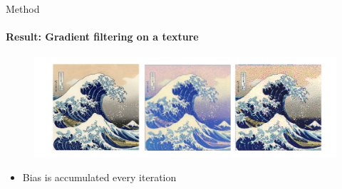 \documentclass[beamer]{standalone}
\begin{document}
\begin{frame}{Method}
    \framesubtitle{Result: Gradient filtering on a texture}
        \begin{figure}[t]
            \includegraphics[width=\linewidth]{./figures/result-5.png}
        \centering
        \end{figure}
        \begin{itemize}    
            \item Bias is accumulated every iteration
        \end{itemize}
    
    \note[item] {
    }
\end{frame}
\end{document}
